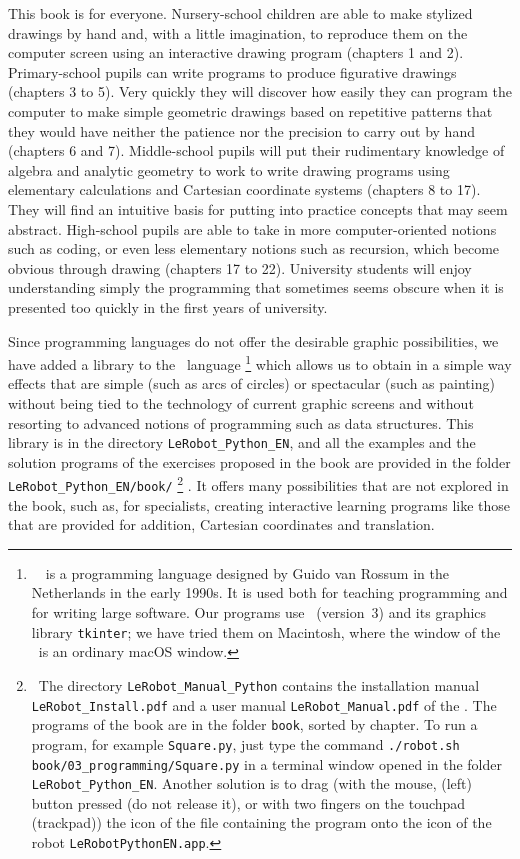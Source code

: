 This book is for everyone. Nursery-school children are able
to make stylized drawings by hand and, with a little imagination, to
reproduce them on the computer
screen using an interactive drawing program (chapters 1 and 2).
Primary-school pupils can write programs to produce
figurative drawings (chapters 3 to 5). Very quickly they will discover how
eas\-i\-ly they can program the computer to make simple geometric drawings based on
repetitive patterns that they would have neither the patience nor the precision to carry out
by hand (chapters 6 and 7). Middle-school pupils will put their
rudimentary knowledge of algebra and analytic geometry to work to write
drawing programs
using elementary calculations and Cartesian coordinate systems (chapters 8 to 17).
They will find an intuitive
basis for putting into practice
concepts that may seem abstract. High-school
pupils are able to take in more computer-oriented notions such as
coding, or even less elementary notions such as
recursion, which become obvious through drawing (chapters 17 to 22). University students
will enjoy understanding simply the programming that sometimes seems obscure when
it is presented too quickly in the first years of university.

\medskip

Since programming languages do not offer the desirable graphic
possibilities, we have added a li\-brary to the \python\ language\@%
%
\footnote{\ \python\ is a programming language designed by Guido van Rossum
in the Netherlands in the early 1990s. It is used both for teaching programming and for
writing large software. Our programs use \python\ (version~3) and its
graphics library {\tt tkinter}; we have tried them on Macintosh, where the window
of the \robot\ is an ordinary macOS window.}
%
which allows us
to obtain in a simple way effects that are simple (such as arcs of circles) or
spectacular (such as painting) without being tied to the technology of
current graphic screens and without resorting to advanced notions of
programming such as data structures. This library is in
the directory \texttt{LeRobot\_Python\_EN}, and
all the examples and the solution programs of the exercises proposed in the book
are provided in the folder {\tt LeRobot\_Python\_EN/book/}%
%
\footnote{\ The directory \texttt{LeRobot\_Manual\_Python} contains the installation manual
\texttt{LeRobot\_Install.pdf} and a user manual \texttt{LeRobot\_Manual.pdf} of the \robot. The programs of the book are in the folder
{\tt book}, sorted by chapter. To run a program, for example
{\tt Square.py}, just type the command {\tt ./robot.sh book/03\_programming/Square.py}
in a terminal window opened in the folder {\tt LeRobot\_Python\_EN}. Another solution
is to drag (with the mouse, (left) button pressed (do not release it), or with two fingers on the touchpad (trackpad)) the icon of the file containing the program onto the icon of the robot \texttt{LeRobotPythonEN.app}.}%
. It offers many possibilities that are not explored in the book,
such as, for specialists, creating interactive learning programs
like those that are provided for addition, Cartesian coordinates and
translation.

